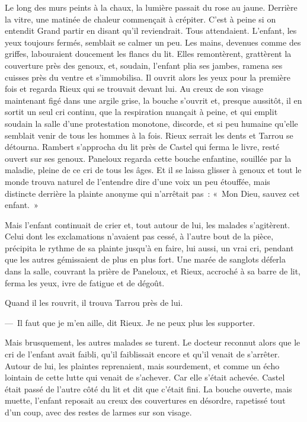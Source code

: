 \documentclass[french,twoside]{book} %
\begin{document}
Le long des murs peints à la chaux, la lumière passait du rose au jaune. Derrière la vitre, une matinée de chaleur commençait à crépiter. C’est à peine si on entendit Grand partir en disant qu’il reviendrait. Tous attendaient. L’enfant, les yeux toujours fermés, semblait se calmer un peu. Les mains, devenues comme des griffes, labouraient doucement les flancs du lit. Elles remontèrent, grattèrent la couverture près des genoux, et, soudain, l’enfant plia ses jambes, ramena ses cuisses près du ventre et s’immobilisa. Il ouvrit alors les yeux pour la première fois et regarda Rieux qui se trouvait devant lui. Au creux de son visage maintenant figé dans une argile grise, la bouche s’ouvrit et, presque aussitôt, il en sortit un seul cri continu, que la respiration nuançait à peine, et qui emplit soudain la salle d’une protestation monotone, discorde, et si peu humaine qu’elle semblait venir de tous les hommes à la fois. Rieux serrait les dents et Tarrou se détourna. Rambert s’approcha du lit près de Castel qui ferma le livre, resté ouvert sur ses genoux. Paneloux regarda cette bouche enfantine, souillée par la maladie, pleine de ce cri de tous les âges. Et il se laissa glisser à genoux et tout le monde trouva naturel de l’entendre dire d’une voix un peu étouffée, mais distincte derrière la plainte anonyme qui n’arrêtait pas : « Mon Dieu, sauvez cet enfant. »\par
Mais l’enfant continuait de crier et, tout autour de lui, les malades s’agitèrent. Celui dont les exclamations n’avaient pas cessé, à l’autre bout de la pièce, précipita le rythme de sa plainte jusqu’à en faire, lui aussi, un vrai cri, pendant que les autres gémissaient de plus en plus fort. Une marée de sanglots déferla dans la salle, couvrant la prière de Paneloux, et Rieux, accroché à sa barre de lit, ferma les yeux, ivre de fatigue et de dégoût.\par
Quand il les rouvrit, il trouva Tarrou près de lui.\par
— Il faut que je m’en aille, dit Rieux. Je ne peux plus les supporter.\par
Mais brusquement, les autres malades se turent. Le docteur reconnut alors que le cri de l’enfant avait faibli, qu’il faiblissait encore et qu’il venait de s’arrêter. Autour de lui, les plaintes reprenaient, mais sourdement, et comme un écho lointain de cette lutte qui venait de s’achever. Car elle s’était achevée. Castel était passé de l’autre côté du lit et dit que c’était fini. La bouche ouverte, mais muette, l’enfant reposait au creux des couvertures en désordre, rapetissé tout d’un coup, avec des restes de larmes sur son visage.\par
\end{document}
